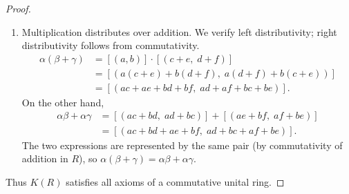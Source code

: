 \begin{proof}
\begin{enumerate}
    \item Multiplication distributes over addition. We verify left distributivity; right distributivity follows from commutativity.
    \begin{align*}
    \alpha (\beta + \gamma) &= [(a,b)] \cdot [(c+e,\; d+f)] \\
    &= [(a(c+e) + b(d+f),\; a(d+f) + b(c+e))] \\
    &= [(ac+ae+bd+bf,\; ad+af+bc+be)].
    \end{align*}
    On the other hand,
    \begin{align*}
    \alpha\beta + \alpha\gamma &= [(ac+bd,\; ad+bc)] + [(ae+bf,\; af+be)] \\
    &= [(ac+bd+ae+bf,\; ad+bc+af+be)].
    \end{align*}
    The two expressions are represented by the same pair (by commutativity of addition in $R$), so $\alpha(\beta+\gamma) = \alpha\beta + \alpha\gamma$.
\end{enumerate}
Thus $K(R)$ satisfies all axioms of a commutative unital ring.
\end{proof}